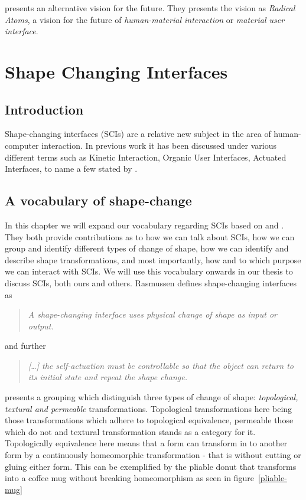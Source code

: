 \citet{ishii2012radical} presents an alternative vision for the future.
They presents the vision as \textit{Radical Atoms}, a vision for the future of \textit{human-material interaction} or \textit{material user interface}. 


\section{Shape Changing Interfaces}
\subsection{Introduction}
Shape-changing interfaces (SCIs) are a relative new subject in the area of human-computer interaction.
In previous work it has been discussed under various different terms such as Kinetic Interaction, Organic User Interfaces, Actuated Interfaces, to name a few stated by \citet{rasmussen2012shape}.

\subsection{A vocabulary of shape-change}
In this chapter we will expand our vocabulary regarding SCIs based on \citet{coelho2011shape} and \citet{rasmussen2012shape}.
They both provide contributions as to how we can talk about SCIs, how we can group and identify different types of change of shape, how we can identify and describe shape transformations, and most importantly, how and to which purpose we can interact with SCIs.
We will use this vocabulary onwards in our thesis to discuss SCIs, both ours and others.   
Rasmussen defines shape-changing interfaces as
\begin{quotation}
\emph{A shape-changing interface uses physical change of shape as input or output.}
\end{quotation}
and further
\begin{quotation}
\emph{[\ldots] the self-actuation must be controllable so that the object can return to its initial state and repeat the shape change.}
\end{quotation}

\citeauthor{coelho2011shape} presents a grouping which distinguish three types of change of shape: \emph{topological, textural and permeable} transformations.
Topological transformations here being those transformations which adhere to topological equivalence, permeable those which do not and textural transformation stands as a category for it. Topologically equivalence here means that a form can transform in to another form by a continuously homeomorphic transformation - that is without cutting or gluing either form. This can be exemplified by the pliable donut that transforms into a coffee mug without breaking homeomorphism as seen in figure~\ref{pliable-mug}  

